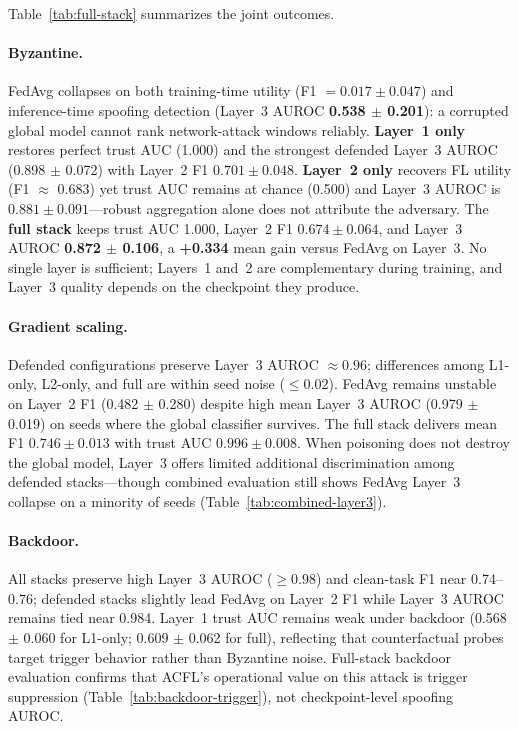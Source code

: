 Table~\ref{tab:full-stack} summarizes the joint outcomes.

\paragraph{Byzantine.}
FedAvg collapses on both training-time utility (F1 $= 0.017 \pm 0.047$) and inference-time spoofing detection (Layer~3 AUROC \textbf{0.538 $\pm$ 0.201}): a corrupted global model cannot rank network-attack windows reliably.
\textbf{Layer~1 only} restores perfect trust AUC (1.000) and the strongest defended Layer~3 AUROC (0.898 $\pm$ 0.072) with Layer~2 F1 $0.701 \pm 0.048$.
\textbf{Layer~2 only} recovers FL utility (F1 $\approx$ 0.683) yet trust AUC remains at chance (0.500) and Layer~3 AUROC is $0.881 \pm 0.091$---robust aggregation alone does not attribute the adversary.
The \textbf{full stack} keeps trust AUC 1.000, Layer~2 F1 $0.674 \pm 0.064$, and Layer~3 AUROC \textbf{0.872 $\pm$ 0.106}, a \textbf{+0.334} mean gain versus FedAvg on Layer~3.
No single layer is sufficient; Layers~1 and~2 are complementary during training, and Layer~3 quality depends on the checkpoint they produce.

\paragraph{Gradient scaling.}
Defended configurations preserve Layer~3 AUROC $\approx 0.96$; differences among L1-only, L2-only, and full are within seed noise ($\leq 0.02$).
FedAvg remains unstable on Layer~2 F1 (0.482 $\pm$ 0.280) despite high mean Layer~3 AUROC (0.979 $\pm$ 0.019) on seeds where the global classifier survives.
The full stack delivers mean F1 $0.746 \pm 0.013$ with trust AUC $0.996 \pm 0.008$.
When poisoning does not destroy the global model, Layer~3 offers limited additional discrimination among defended stacks---though combined evaluation still shows FedAvg Layer~3 collapse on a minority of seeds (Table~\ref{tab:combined-layer3}).

\paragraph{Backdoor.}
All stacks preserve high Layer~3 AUROC ($\geq 0.98$) and clean-task F1 near 0.74--0.76; defended stacks slightly lead FedAvg on Layer~2 F1 while Layer~3 AUROC remains tied near 0.984.
Layer~1 trust AUC remains weak under backdoor (0.568 $\pm$ 0.060 for L1-only; 0.609 $\pm$ 0.062 for full), reflecting that counterfactual probes target trigger behavior rather than Byzantine noise.
Full-stack backdoor evaluation confirms that ACFL's operational value on this attack is trigger suppression (Table~\ref{tab:backdoor-trigger}), not checkpoint-level spoofing AUROC.

